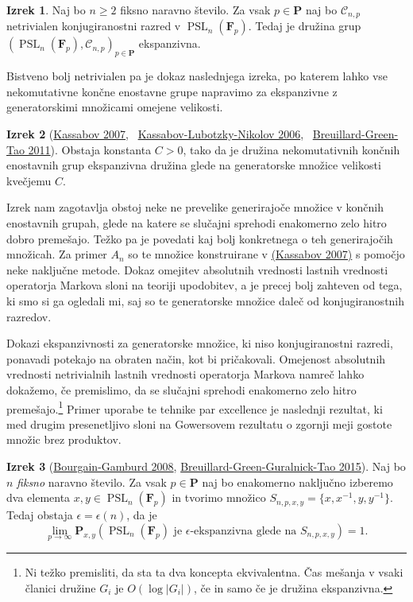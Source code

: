 \documentclass[11pt]{book}
\def\conclass{\mathcal{C}}
\def\FF{\mathbf{F}}
\def\PP{\mathbf{P}}
\DeclareMathOperator\PSL{PSL}
\theoremstyle{definition}
\theoremstyle{zgled}
\theoremstyle{odprtproblem}
\theoremstyle{domacanaloga}
\theoremstyle{izrek}
\newtheorem*{izrek}{Izrek}
\begin{document}
\begin{izrek}
Naj bo $n \geq 2$ fiksno naravno število. Za vsak $p \in \PP$ naj bo $\conclass_{n,p}$ netrivialen konjugiranostni razred v $\PSL_n(\FF_p)$. Tedaj je družina grup $( \PSL_n(\FF_p), \conclass_{n,p} )_{p \in \PP}$ ekspanzivna.
\end{izrek}

Bistveno bolj netrivialen pa je dokaz naslednjega izreka, po katerem lahko vse nekomutativne končne enostavne grupe napravimo za ekspanzivne z generatorskimi množicami omejene velikosti.

\begin{izrek}[\href{https://link.springer.com/article/10.1007/s00222-007-0065-y}{Kassabov 2007}, \ \href{https://www.pnas.org/doi/abs/10.1073/pnas.0510337103}{Kassabov-Lubotzky-Nikolov 2006}, \ \href{https://terrytao.wordpress.com/2010/05/06/suzuki-groups-as-expanders/}{Breuillard-Green-Tao 2011}]
Obstaja konstanta $C > 0$, tako da je družina nekomutativnih končnih enostavnih grup ekspanzivna družina glede na generatorske množice velikosti kvečjemu $C$.
\end{izrek}

Izrek nam zagotavlja obstoj neke ne prevelike generirajoče množice v končnih enostavnih grupah, glede na katere se slučajni sprehodi enakomerno zelo hitro dobro premešajo. Težko pa je povedati kaj bolj konkretnega o teh generirajočih množicah. Za primer $A_n$ so te množice konstruirane v \href{https://link.springer.com/article/10.1007/s00222-007-0065-y}{(Kassabov 2007)} s pomočjo neke naključne metode. Dokaz omejitev absolutnih vrednosti lastnih vrednosti operatorja Markova sloni na teoriji upodobitev, a je precej bolj zahteven od tega, ki smo si ga ogledali mi, saj so te generatorske množice daleč od konjugiranostnih razredov.

Dokazi ekspanzivnosti za generatorske množice, ki niso konjugiranostni razredi, ponavadi potekajo na obraten način, kot bi pričakovali. Omejenost absolutnih vrednosti netrivialnih lastnih vrednosti operatorja Markova namreč lahko dokažemo, če premislimo, da se slučajni sprehodi enakomerno zelo hitro premešajo.\footnote{Ni težko premisliti, da sta ta dva koncepta ekvivalentna. Čas mešanja v vsaki članici družine $G_i$ je $O(\log |G_i|)$, če in samo če je družina ekspanzivna.} Primer uporabe te tehnike par excellence je naslednji rezultat, ki med drugim presenetljivo sloni na Gowersovem rezultatu o zgornji meji gostote množic brez produktov.

\begin{izrek}[\href{https://annals.math.princeton.edu/2008/167-2/p07}{Bourgain-Gamburd 2008}, \href{https://ems.press/journals/jems/articles/12498}{Breuillard-Green-Guralnick-Tao 2015}]
Naj bo $n$ \emph{fiksno} naravno število. Za vsak $p \in \PP$ naj bo enakomerno naključno izberemo dva elementa $x,y \in \PSL_n(\FF_p)$ in tvorimo množico $S_{n,p,x,y} = \{ x, x^{-1}, y, y^{-1} \}$. Tedaj obstaja $\epsilon = \epsilon(n)$, da je 
\[
    \lim_{p \to \infty} \PP_{x,y}(\text{$\PSL_n(\FF_p)$ je $\epsilon$-ekspanzivna glede na $S_{n,p,x,y}$}) = 1.
\]
\end{izrek}
\end{document}
